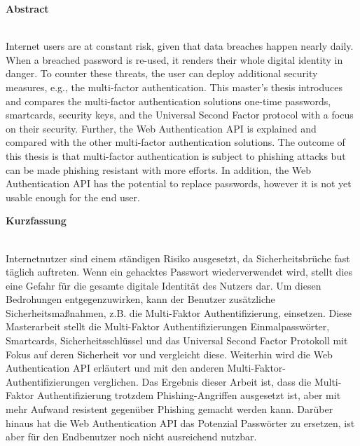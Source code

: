 \thispagestyle{noheader}
\setlength{\columnsep}{1cm}

{}

\begin{multicols}{2}
	\begin{large}
		\textbf{Abstract} \\ \\
	\end{large}
	Internet users are at constant risk, given that data breaches happen nearly daily. When a breached password is re-used, it renders their whole digital identity in danger. To counter these threats, the user can deploy additional security measures, e.g., the multi-factor authentication. This master's thesis introduces and compares the multi-factor authentication solutions one-time passwords, smartcards, security keys, and the Universal Second Factor protocol with a focus on their security. Further, the Web Authentication API is explained and compared with the other multi-factor authentication solutions. The outcome of this thesis is that multi-factor authentication is subject to phishing attacks but can be made phishing resistant with more efforts. In addition, the Web Authentication API has the potential to replace passwords, however it is not yet usable enough for the end user.
	\columnbreak \\
	\begin{large}
		\textbf{Kurzfassung} \\ \\
	\end{large}
	Internetnutzer sind einem ständigen Risiko ausgesetzt, da Sicherheitsbrüche fast täglich auftreten. Wenn ein gehacktes Passwort wiederverwendet wird, stellt dies eine Gefahr für die gesamte digitale Identität des Nutzers dar. Um diesen Bedrohungen entgegenzuwirken, kann der Benutzer zusätzliche Sicherheitsmaßnahmen, z.B. die Multi-Faktor Authentifizierung, einsetzen. Diese Masterarbeit stellt die Multi-Faktor Authentifizierungen Einmalpasswörter, Smartcards, Sicherheitsschlüssel und das Universal Second Factor Protokoll mit Fokus auf deren Sicherheit vor und vergleicht diese. Weiterhin wird die Web Authentication API erläutert und mit den anderen Multi-Faktor-Authentifizierungen verglichen. Das Ergebnis dieser Arbeit ist, dass die Multi-Faktor Authentifizierung trotzdem Phishing-Angriffen ausgesetzt ist, aber mit mehr Aufwand resistent gegenüber Phishing gemacht werden kann. Darüber hinaus hat die Web Authentication API das Potenzial Passwörter zu ersetzen, ist aber für den Endbenutzer noch nicht ausreichend nutzbar.
\end{multicols}

\addvspace{2cm}


\newpage